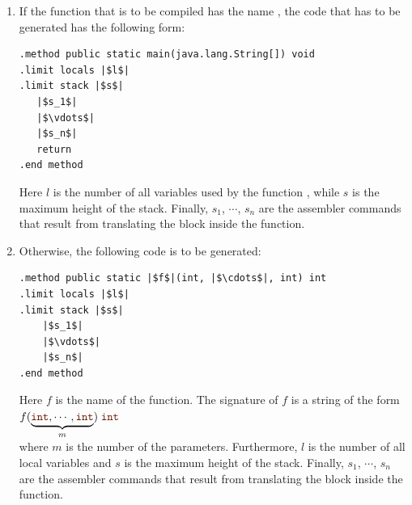 \begin{enumerate}
\item If the function that  is to be compiled has the name , the code that has to be generated
      has the following form:

      \begin{verbatim}
.method public static main(java.lang.String[]) void
.limit locals |$l$|
.limit stack |$s$|
   |$s_1$|
   |$\vdots$|
   |$s_n$|
   return
.end method
      \end{verbatim}

       Here $l$ is the number of all variables used by the function , while $s$ is the maximum
       height of the stack.
       Finally,  $s_1$, $\cdots$, $s_n$ are the assembler commands that result from translating the block
       inside the function.

\item Otherwise, the following code is to be generated:

      \begin{verbatim}
.method public static |$f$|(int, |$\cdots$|, int) int
.limit locals |$l$|
.limit stack |$s$|
    |$s_1$|
    |$\vdots$|
    |$s_n$|
.end method
      \end{verbatim}
       
       Here $f$ is the name of the function.  The signature of $f$ is a string of the form
       \\[0.2cm]
       \hspace*{1.3cm}
       $f(\underbrace{\mytt{int},\cdots,\mytt{int}}_{m})\;\mytt{int}$
       \\[0.2cm]
       where $m$ is the number of the parameters.  Furthermore, 
       $l$ is the number of all local variables and  $s$
       is the maximum height of the stack.  Finally,
       $s_1$, $\cdots$, $s_n$ are the assembler commands that result from translating the block inside the function.
\end{enumerate}
